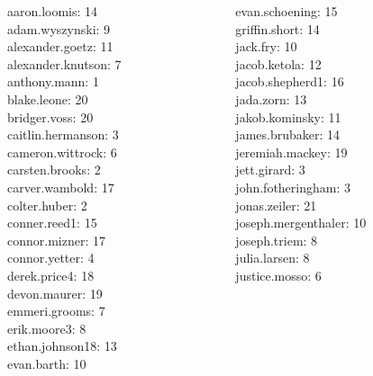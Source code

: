 \documentclass[10pt]{beamer}
\begin{document}
\begin{frame}
\footnotesize 
\vfill 
\begin{columns}
\begin{column}{0.33\textwidth}
aaron.loomis: 14 \\ 
adam.wyszynski: 9 \\ 
alexander.goetz: 11 \\ 
alexander.knutson: 7 \\ 
anthony.mann: 1 \\ 
blake.leone: 20 \\ 
bridger.voss: 20 \\ 
caitlin.hermanson: 3 \\ 
cameron.wittrock: 6 \\ 
carsten.brooks: 2 \\ 
carver.wambold: 17 \\ 
colter.huber: 2 \\ 
conner.reed1: 15 \\ 
connor.mizner: 17 \\ 
connor.yetter: 4 \\ 
derek.price4: 18 \\ 
devon.maurer: 19 \\ 
emmeri.grooms: 7 \\ 
erik.moore3: 8 \\ 
ethan.johnson18: 13 \\ 
evan.barth: 10 \\\end{column}
\begin{column}{0.33\textwidth}
evan.schoening: 15 \\ 
griffin.short: 14 \\ 
jack.fry: 10 \\ 
jacob.ketola: 12 \\ 
jacob.shepherd1: 16 \\ 
jada.zorn: 13 \\ 
jakob.kominsky: 11 \\ 
james.brubaker: 14 \\ 
jeremiah.mackey: 19 \\ 
jett.girard: 3 \\ 
john.fotheringham: 3 \\ 
jonas.zeiler: 21 \\ 
joseph.mergenthaler: 10 \\ 
joseph.triem: 8 \\ 
julia.larsen: 8 \\ 
justice.mosso: 6 \\ 

\end{column}
\end{columns}
\end{frame}
\end{document}
